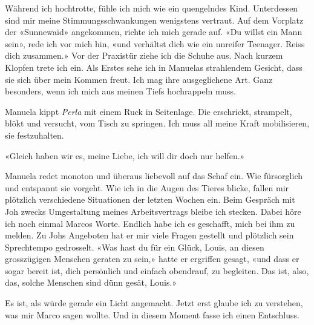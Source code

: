 Während ich hochtrotte, fühle ich mich wie ein quengelndes Kind.
Unterdessen sind mir meine Stimmungsschwankungen wenigstens vertraut.
Auf dem Vorplatz der «Sunnewaid» angekommen, richte ich mich gerade auf.
«Du willst ein Mann sein», rede ich vor mich hin, «und verhältst dich
wie ein unreifer Teenager. Reiss dich zusammen.»
Vor der Praxistür ziehe ich die Schuhe aus. Nach kurzem Klopfen trete
ich ein. Als Erstes sehe ich in Manuelas strahlendem Gesicht, dass sie
sich über mein Kommen freut. Ich mag ihre ausgeglichene Art. Ganz
besonders, wenn ich mich aus meinen Tiefs hochrappeln muss.

Manuela kippt \emph{Perla} mit einem Ruck in Seitenlage. Die erschrickt,
strampelt, blökt und versucht, vom Tisch zu springen. Ich muss all meine
Kraft mobilisieren, sie festzuhalten.

«Gleich haben wir es, meine Liebe, ich will dir doch nur helfen.»

Manuela redet monoton und überaus liebevoll auf das Schaf ein.
Wie fürsorglich und entspannt sie vorgeht.
Wie ich in die Augen des Tieres blicke, fallen mir plötzlich
verschiedene Situationen der letzten Wochen ein. Beim Gespräch mit Joh
zwecks Umgestaltung meines Arbeitsvertrags bleibe ich stecken. Dabei
höre ich noch einmal Marcos Worte. Endlich habe ich es geschafft, mich
bei ihm zu melden. Zu Johs Angeboten hat er mir viele Fragen gestellt
und plötzlich sein Sprechtempo gedrosselt.
«Was hast du für ein Glück, Louis, an diesen grosszügigen Menschen
geraten zu sein,» hatte er ergriffen gesagt, «und dass er sogar bereit
ist, dich persönlich und einfach obendrauf, zu begleiten. Das ist, also,
das, solche Menschen sind dünn gesät, Louis.»

Es ist, als würde gerade ein Licht angemacht. Jetzt erst glaube ich zu
verstehen, was mir Marco sagen wollte. Und in diesem Moment fasse ich einen Entschluss.
